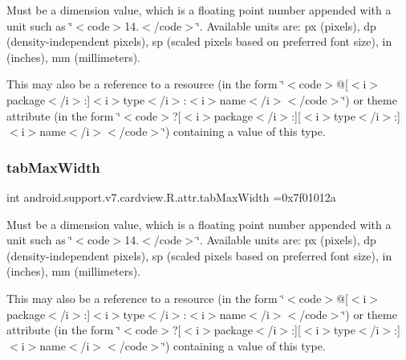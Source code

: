 Must be a dimension value, which is a floating point number appended with a unit such as \char`\"{}$<$code$>$14.\+5sp$<$/code$>$\char`\"{}. Available units are\+: px (pixels), dp (density-\/independent pixels), sp (scaled pixels based on preferred font size), in (inches), mm (millimeters). 

This may also be a reference to a resource (in the form \char`\"{}$<$code$>$@\mbox{[}$<$i$>$package$<$/i$>$\+:\mbox{]}$<$i$>$type$<$/i$>$\+:$<$i$>$name$<$/i$>$$<$/code$>$\char`\"{}) or theme attribute (in the form \char`\"{}$<$code$>$?\mbox{[}$<$i$>$package$<$/i$>$\+:\mbox{]}\mbox{[}$<$i$>$type$<$/i$>$\+:\mbox{]}$<$i$>$name$<$/i$>$$<$/code$>$\char`\"{}) containing a value of this type. \mbox{\label{classandroid_1_1support_1_1v7_1_1cardview_1_1R_1_1attr_a62bbe7ecd0c461ba4944a576d2ef8e66}} 
\subsubsection{\texorpdfstring{tab\+Max\+Width}{tabMaxWidth}}
{\footnotesize\ttfamily int android.\+support.\+v7.\+cardview.\+R.\+attr.\+tab\+Max\+Width =0x7f01012a\hspace{0.3cm}{\ttfamily [static]}}

Must be a dimension value, which is a floating point number appended with a unit such as \char`\"{}$<$code$>$14.\+5sp$<$/code$>$\char`\"{}. Available units are\+: px (pixels), dp (density-\/independent pixels), sp (scaled pixels based on preferred font size), in (inches), mm (millimeters). 

This may also be a reference to a resource (in the form \char`\"{}$<$code$>$@\mbox{[}$<$i$>$package$<$/i$>$\+:\mbox{]}$<$i$>$type$<$/i$>$\+:$<$i$>$name$<$/i$>$$<$/code$>$\char`\"{}) or theme attribute (in the form \char`\"{}$<$code$>$?\mbox{[}$<$i$>$package$<$/i$>$\+:\mbox{]}\mbox{[}$<$i$>$type$<$/i$>$\+:\mbox{]}$<$i$>$name$<$/i$>$$<$/code$>$\char`\"{}) containing a value of this type. \mbox{\label{classandroid_1_1support_1_1v7_1_1cardview_1_1R_1_1attr_a03ed2a5363c4bba9d9e149f556990a01}} 
